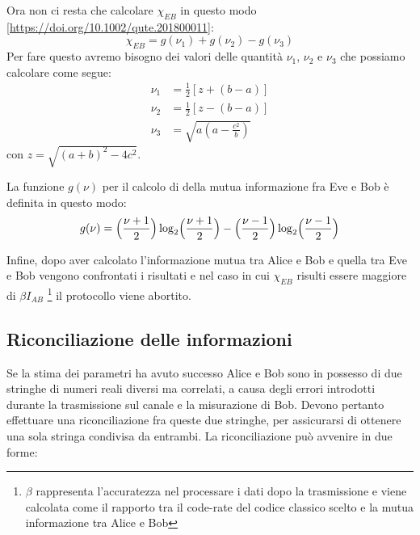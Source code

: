 Ora non ci resta che calcolare $\chi_{EB}$ in questo modo \ref{https://doi.org/10.1002/qute.201800011}:
\begin{equation} \label{eq:EB-info}
\chi_{EB} = g(\nu_1) + g(\nu_2) - g(\nu_3)
\end{equation}
Per fare questo avremo bisogno dei valori delle quantit\`a $\nu_1$, $\nu_2$ e $\nu_3$ che possiamo calcolare come segue:
\begin{equation} \label{eq:nuCalc}
\begin{split}
\nu_1& = \frac{1}{2}[z + (b - a)] \\
\nu_2& = \frac{1}{2}[z - (b - a)] \\
\nu_3& = \sqrt{a (a - \frac{c^2}{b})}
\end{split}
\end{equation}
con $z = \sqrt{(a + b)^2 - 4 c^2}$.

La funzione $g(\nu)$ per il calcolo di della mutua informazione fra Eve e Bob \`e definita in questo modo:
\begin{equation} \label{eq:g}
g(\nu) = \Bigl (\frac{\nu + 1}{2}\Bigr ) \log_2 \Bigl (\frac{\nu + 1}{2}\Bigr ) - \Bigl (\frac{\nu - 1}{2}\Bigr ) \log_2 \Bigl (\frac{\nu - 1}{2}\Bigr )
\end{equation}

Infine, dopo aver calcolato l'informazione mutua tra Alice e Bob e quella tra Eve e Bob vengono confrontati i risultati e nel caso in cui $\chi_{EB}$ risulti essere maggiore di $\beta I_{AB}$ \footnote{$\beta$ rappresenta l'accuratezza nel processare i dati dopo la trasmissione e viene calcolata come il rapporto tra il code-rate del codice classico scelto e la mutua informazione tra Alice e Bob} il protocollo viene abortito.

\subsection{Riconciliazione delle informazioni}\label{subse:riconciliazione}
Se la stima dei parametri ha avuto successo Alice e Bob sono in possesso di due stringhe di numeri reali diversi ma correlati, a causa degli errori introdotti durante la trasmissione sul canale e la misurazione di Bob. Devono pertanto effettuare una riconciliazione fra queste due stringhe, per assicurarsi di ottenere una sola stringa condivisa da entrambi. La riconciliazione pu\`o avvenire in due forme: 

